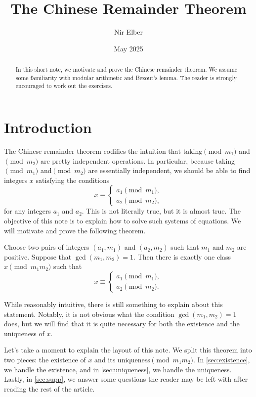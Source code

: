 \documentclass{article}
\title{The Chinese Remainder Theorem}
\author{Nir Elber}
\date{May 2025}
\begin{document}
\maketitle

\begin{abstract}
	In this short note, we motivate and prove the Chinese remainder theorem. We assume some familiarity with modular arithmetic and Bezout's lemma. The reader is strongly encouraged to work out the exercises.
\end{abstract}

\tableofcontents

\setcounter{section}{0}
\section{Introduction}
The Chinese remainder theorem codifies the intuition that taking$\pmod{m_1}$ and$\pmod{m_2}$ are pretty independent operations. In particular, because taking$\pmod{m_1}$ and$\pmod{m_2}$ are essentially independent, we should be able to find integers $x$ satisfying the conditions
\[x\equiv\begin{cases}
	a_1\pmod{m_1}, \\
	a_2\pmod{m_2},
\end{cases}\]
for any integers $a_1$ and $a_2$. This is not literally true, but it is almost true. The objective of this note is to explain how to solve such systems of equations. We will motivate and prove the following theorem.
\begin{theorem} \label{thm:crt}
	Choose two pairs of integers $(a_1,m_1)$ and $(a_2,m_2)$ such that $m_1$ and $m_2$ are positive. Suppose that $\gcd(m_1,m_2)=1$. Then there is exactly one class $x\pmod{m_1m_2}$ such that
	\[x\equiv\begin{cases}
		a_1 \pmod{m_1}, \\
		a_2 \pmod{m_2}.
	\end{cases}\]
\end{theorem}
While reasonably intuitive, there is still something to explain about this statement. Notably, it is not obvious what the condition $\gcd(m_1,m_2)=1$ does, but we will find that it is quite necessary for both the existence and the uniqueness of $x$.

Let's take a moment to explain the layout of this note. We split this theorem into two pieces: the existence of $x$ and its uniqueness$\pmod{m_1m_2}$. In \cref{sec:existence}, we handle the existence, and in \cref{sec:uniqueness}, we handle the uniqueness. Lastly, in \cref{sec:supp}, we answer some questions the reader may be left with after reading the rest of the article.
\end{document}
